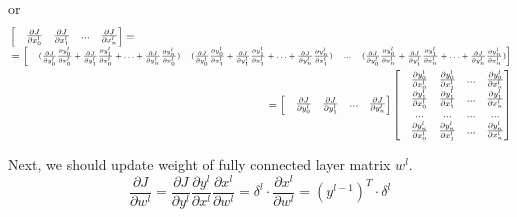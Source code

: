 or 
\begin{equation}
\label{eq:CNN_softmax_grad_long}
	\begin{multlined}
	\begin{bmatrix} 
	&\frac{\partial J}{\partial x^{l}_{0}} &\frac{\partial J}{\partial x^{l}_{1}} & ... &\frac{\partial J}{\partial x^{l}_{n}} 
	\end{bmatrix} 
	= \\= \scriptsize 
	\begin{bmatrix} & (\frac{\partial J}{\partial y^{l}_{0}}\frac{\partial y^{l}_{0}}{\partial x^{l}_{0}}+\frac{\partial J}{\partial y^{l}_{1}}\frac{\partial y^{l}_{1}}{\partial x^{l}_{0}}+\ldots+\frac{\partial J}{\partial y^{l}_{n}}\frac{\partial y^{l}_{n}}{\partial x^{l}_{0}}) & (\frac{\partial J}{\partial y^{l}_{0}}\frac{\partial y^{l}_{0}}{\partial x^{l}_{1}}+\frac{\partial J}{\partial y^{l}_{1}}\frac{\partial y^{l}_{1}}{\partial x^{l}_{1}}+\ldots+\frac{\partial J}{\partial y^{l}_{n}}\frac{\partial y^{l}_{n}}{\partial x^{l}_{1}}) & ... & (\frac{\partial J}{\partial y^{l}_{0}}\frac{\partial y^{l}_{0}}{\partial x^{l}_{n}}+\frac{\partial J}{\partial y^{l}_{1}}\frac{\partial y^{l}_{1}}{\partial x^{l}_{n}}+\ldots+\frac{\partial J}{\partial y^{l}_{n}}\frac{\partial y^{l}_{n}}{\partial x^{l}_{n}}) 
	\end{bmatrix} \\= 
	\begin{bmatrix} &\frac{\partial J}{\partial y^{l}_{0}} &\frac{\partial J}{\partial y^{l}_{1}} & ... &\frac{\partial J}{\partial y^{l}_{n}} 
	\end{bmatrix} 
	\begin{bmatrix} &\frac{\partial y^{l}_{0}}{\partial x^{l}_{0}} &\frac{\partial y^{l}_{0}}{\partial x^{l}_{1}}&...&\frac{\partial y^{l}_{0}}{\partial x^{l}_{n}}\\ &\frac{\partial y^{l}_{1}}{\partial x^{l}_{0}} &\frac{\partial y^{l}_{1}}{\partial x^{l}_{1}}&...&\frac{\partial y^{l}_{1}}{\partial x^{l}_{n}}\\ &...&...&...&...\\ &\frac{\partial y^{l}_{n}}{\partial x^{l}_{0}} &\frac{\partial y^{l}_{n}}{\partial x^{l}_{1}}&...&\frac{\partial y^{l}_{n}}{\partial x^{l}_{n}}\\ 
	\end{bmatrix}
	\end{multlined}
\end{equation}

Next, we should update weight of fully connected layer matrix $w^l$. 
\begin{equation}
\frac{\partial J}{\partial w^l} = \dfrac{\partial J}{\partial y^l}\dfrac{\partial y^l}{\partial x^l}\dfrac{\partial x^l}{\partial w^l} = \delta^l \cdot \dfrac{\partial x^l}{\partial w^l} = \left(y^{l-1} \right)^T \cdot \delta^l    
\end{equation}

